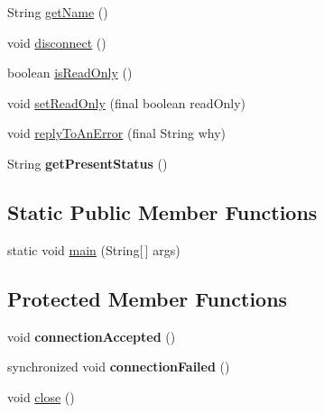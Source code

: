 \begin{DoxyCompactItemize}
\item 
String \hyperlink{classgov_1_1fnal_1_1ppd_1_1dd_1_1chat_1_1MessagingClient_afe1ec3b4d646cebe99db9579a6682643}{get\-Name} ()
\item 
void \hyperlink{classgov_1_1fnal_1_1ppd_1_1dd_1_1chat_1_1MessagingClient_ab28012456765215ffdf3b9beb3f3ef00}{disconnect} ()
\item 
boolean \hyperlink{classgov_1_1fnal_1_1ppd_1_1dd_1_1chat_1_1MessagingClient_a0f0d1ad1f8dcf7eec17aea757a892f36}{is\-Read\-Only} ()
\item 
void \hyperlink{classgov_1_1fnal_1_1ppd_1_1dd_1_1chat_1_1MessagingClient_a17056456457c874463b76d4bd0c7c167}{set\-Read\-Only} (final boolean read\-Only)
\item 
void \hyperlink{classgov_1_1fnal_1_1ppd_1_1dd_1_1chat_1_1MessagingClient_afcf0a1f43fdbdee733d51f75ad9845f9}{reply\-To\-An\-Error} (final String why)
\item 
\hypertarget{classgov_1_1fnal_1_1ppd_1_1dd_1_1chat_1_1MessagingClient_a774e53e588366cf5ab9ec1497e355844}{String {\bfseries get\-Present\-Status} ()}\label{classgov_1_1fnal_1_1ppd_1_1dd_1_1chat_1_1MessagingClient_a774e53e588366cf5ab9ec1497e355844}

\end{DoxyCompactItemize}
\subsection*{Static Public Member Functions}
\begin{DoxyCompactItemize}
\item 
static void \hyperlink{classgov_1_1fnal_1_1ppd_1_1dd_1_1chat_1_1MessagingClient_aecbd81343fff7acb75d14ba29c973ed3}{main} (String\mbox{[}$\,$\mbox{]} args)
\end{DoxyCompactItemize}
\subsection*{Protected Member Functions}
\begin{DoxyCompactItemize}
\item 
\hypertarget{classgov_1_1fnal_1_1ppd_1_1dd_1_1chat_1_1MessagingClient_ae7a2a256431770ac9b0f06d444aa636e}{void {\bfseries connection\-Accepted} ()}\label{classgov_1_1fnal_1_1ppd_1_1dd_1_1chat_1_1MessagingClient_ae7a2a256431770ac9b0f06d444aa636e}

\item 
\hypertarget{classgov_1_1fnal_1_1ppd_1_1dd_1_1chat_1_1MessagingClient_ab42c0b4f0a822c6d2612f1121698ae01}{synchronized void {\bfseries connection\-Failed} ()}\label{classgov_1_1fnal_1_1ppd_1_1dd_1_1chat_1_1MessagingClient_ab42c0b4f0a822c6d2612f1121698ae01}

\item 
void \hyperlink{classgov_1_1fnal_1_1ppd_1_1dd_1_1chat_1_1MessagingClient_a701c9889979e93718a0066cb45f063bb}{close} ()
\end{DoxyCompactItemize}
